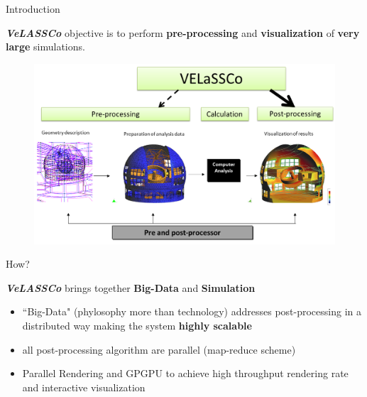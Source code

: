 \documentclass{beamer}
\begin{document}
  \begin{frame}{Introduction}
		\begin{exampleblock}{\textbf{\textit{ VeLASSCo}} objective is to perform}	
	 		\textbf{pre-processing} and \textbf{visualization} of \textbf{very large} simulations.
		\end{exampleblock}	
		
		 \begin{figure}
			 \centering
			   \includegraphics[width=\textwidth]{velassco-context}
		 \end{figure}

\end{frame} %

  \begin{frame}{How?}
		\begin{exampleblock}{\textbf{\textit{ VeLASSCo}} brings together	\textbf{Big-Data} and \textbf{Simulation}}
		

		\begin{itemize}
			\item ``Big-Data" (phylosophy more than technology) addresses post-processing in a distributed way making the system \textbf{highly scalable}
			\item all post-processing algorithm are parallel (map-reduce scheme)
			\item Parallel Rendering and GPGPU to achieve high throughput rendering rate and interactive visualization
		\end{itemize}

		\end{exampleblock}	
		
		

\end{frame} %
\end{document}

